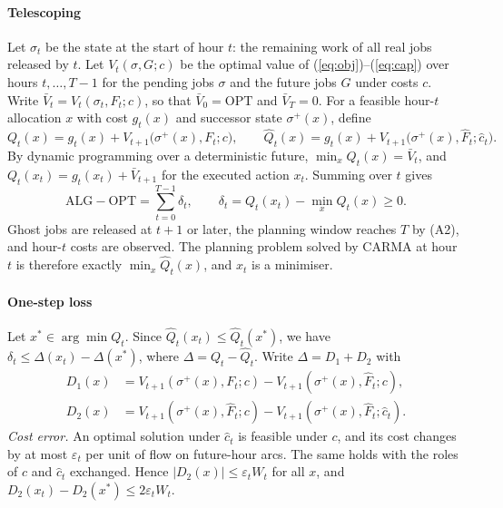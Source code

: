 \paragraph{Telescoping} Let $\sigma_t$ be the state at the start of hour $t$: the remaining work of all real jobs released by $t$. Let $V_t(\sigma,G;c)$ be the optimal value of (\ref{eq:obj})--(\ref{eq:cap}) over hours $t,\dots,T-1$ for the pending jobs $\sigma$ and the future jobs $G$ under costs $c$. Write $\bar V_t=V_t(\sigma_t,F_t;c)$, so that $\bar V_0=\mathrm{OPT}$ and $\bar V_T=0$. For a feasible hour-$t$ allocation $x$ with cost $g_t(x)$ and successor state $\sigma^+(x)$, define
\[
Q_t(x)=g_t(x)+V_{t+1}\big(\sigma^+(x),F_t;c\big),\qquad \hat Q_t(x)=g_t(x)+V_{t+1}\big(\sigma^+(x),\hat F_t;\hat c_t\big).
\]
By dynamic programming over a deterministic future, $\min_xQ_t(x)=\bar V_t$, and $Q_t(x_t)=g_t(x_t)+\bar V_{t+1}$ for the executed action $x_t$. Summing over $t$ gives
\[
\mathrm{ALG}-\mathrm{OPT}=\sum_{t=0}^{T-1}\delta_t,\qquad \delta_t=Q_t(x_t)-\min_xQ_t(x)\ge 0.
\]
Ghost jobs are released at $t+1$ or later, the planning window reaches $T$ by (A2), and hour-$t$ costs are observed. The planning problem solved by CARMA at hour $t$ is therefore exactly $\min_x\hat Q_t(x)$, and $x_t$ is a minimiser.

\paragraph{One-step loss} Let $x^*\in\arg\min Q_t$. Since $\hat Q_t(x_t)\le\hat Q_t(x^*)$, we have $\delta_t\le\Delta(x_t)-\Delta(x^*)$, where $\Delta=Q_t-\hat Q_t$. Write $\Delta=D_1+D_2$ with
\begin{align*}
D_1(x)&=V_{t+1}(\sigma^+(x),F_t;c)-V_{t+1}(\sigma^+(x),\hat F_t;c),\\
D_2(x)&=V_{t+1}(\sigma^+(x),\hat F_t;c)-V_{t+1}(\sigma^+(x),\hat F_t;\hat c_t).
\end{align*}
\emph{Cost error.} An optimal solution under $\hat c_t$ is feasible under $c$, and its cost changes by at most $\varepsilon_t$ per unit of flow on future-hour arcs. The same holds with the roles of $c$ and $\hat c_t$ exchanged. Hence $|D_2(x)|\le\varepsilon_tW_t$ for all $x$, and $D_2(x_t)-D_2(x^*)\le 2\varepsilon_tW_t$.

